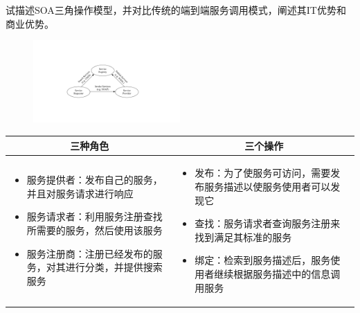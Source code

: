 \begin{problem}
试描述SOA三角操作模型，并对比传统的端到端服务调用模式，阐述其IT优势和商业优势。
\end{problem}

\begin{solution}
\begin{figure}[H]
    \vspace{-0.5em}
	\centering
	\includegraphics[width=0.5\textwidth]{SOA三角操作模型.pdf}
    \vspace{-1em}
\end{figure}

\begin{spacing}{1.2}
    \vspace{-0.5em}
    \begin{longtable}{|m{7.5cm}|m{7.5cm}|}
        \hline
        \multicolumn{1}{|c|}{\textbf{三种角色}} & \multicolumn{1}{c|}{\textbf{三个操作}} \\ \hline
        \vspace{-1.3em}
        \begin{itemize}[leftmargin=1.5em,itemsep=-3pt]
            \item 服务提供者：发布自己的服务，并且对服务请求进行响应
            \item 服务请求者：利用服务注册查找所需要的服务，然后使用该服务
            \item 服务注册商：注册已经发布的服务，对其进行分类，并提供搜索服务 
        \vspace{-1.5em}
        \end{itemize}                                           
            & 
        \vspace{-1.3em}
        \begin{itemize}[leftmargin=1.5em,itemsep=-3pt]
            \item 发布：为了使服务可访问，需要发布服务描述以使服务使用者可以发现它
            \item 查找：服务请求者查询服务注册来找到满足其标准的服务
            \item 绑定：检索到服务描述后，服务使用者继续根据服务描述中的信息调用服务
        \vspace{-1.5em}
        \end{itemize}  
        \\ \hline
    \end{longtable}
    \vspace{-1em}
\end{spacing}


\end{solution}
